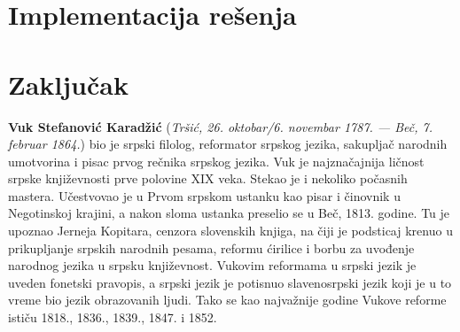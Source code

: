 \documentclass[12pt,oneside]{memoir}
\begin{document}
\pangrami

\pangrami

\chapter{Implementacija rešenja}
\label{chp:Implementacija}

\chapter{Zaključak}
\pangrami

\pangrami

\literatura

\backmatter

\begin{biografija}
  \textbf{Vuk Stefanović Karadžić} (\emph{Tršić,
    26. oktobar/6. novembar 1787. — Beč, 7. februar 1864.}) bio je
  srpski filolog, reformator srpskog jezika, sakupljač narodnih
  umotvorina i pisac prvog rečnika srpskog jezika.  Vuk je
  najznačajnija ličnost srpske književnosti prve polovine XIX
  veka. Stekao je i nekoliko počasnih mastera.  Učestvovao je u
  Prvom srpskom ustanku kao pisar i činovnik u Negotinskoj krajini, a
  nakon sloma ustanka preselio se u Beč, 1813. godine. Tu je upoznao
  Jerneja Kopitara, cenzora slovenskih knjiga, na čiji je podsticaj
  krenuo u prikupljanje srpskih narodnih pesama, reformu ćirilice i
  borbu za uvođenje narodnog jezika u srpsku književnost. Vukovim
  reformama u srpski jezik je uveden fonetski pravopis, a srpski jezik
  je potisnuo slavenosrpski jezik koji je u to vreme bio jezik
  obrazovanih ljudi. Tako se kao najvažnije godine Vukove reforme
  ističu 1818., 1836., 1839., 1847. i 1852.
\end{biografija}
\end{document}

